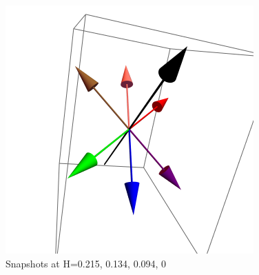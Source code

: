 \documentclass{article}
\begin{document}
\begin{figure}[ht]
\includegraphics[scale=0.22]{HVariedData/Pictures/011Dec216.png}
\caption{Snapshots at H=0.215, 0.134, 0.094, 0}
\end{figure}
\end{document}
